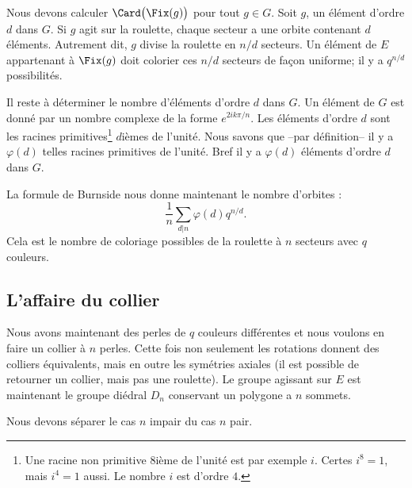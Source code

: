 Nous devons calculer \( \Card\big( \Fix(g) \big)\) pour tout \( g\in G\). Soit \( g\), un élément d'ordre \( d\) dans \( G\). Si \( g\) agit sur la roulette, chaque secteur a une orbite contenant \( d\) éléments. Autrement dit, \( g\) divise la roulette en \( n/d\) secteurs. Un élément de \( E\) appartenant à \( \Fix(g)\) doit colorier ces \( n/d\) secteurs de façon uniforme; il y a \( q^{n/d}\) possibilités.

Il reste à déterminer le nombre d'éléments d'ordre \( d\) dans \( G\). Un élément de \( G\) est donné par un nombre complexe de la forme \(  e^{2ik\pi/n}\). Les éléments d'ordre \( d\) sont les racines primitives\footnote{Une racine non primitive \( 8\)ième de l'unité est par exemple \( i\). Certes \( i^8=1\), mais \( i^4=1\) aussi. Le nombre \( i\) est d'ordre \( 4\).} \( d\)ièmes de l'unité. Nous savons que --par définition-- il y a \( \varphi(d)\) telles racines primitives de l'unité. Bref il y a \( \varphi(d)\) éléments d'ordre \( d\) dans \( G\). 

La formule de Burnside nous donne maintenant le nombre d'orbites :
\begin{equation}
    \frac{1}{ n }\sum_{d|n}\varphi(d)q^{n/d}.
\end{equation}
Cela est le nombre de coloriage possibles de la roulette à \( n\) secteurs avec \( q\) couleurs.

\subsection{L'affaire du collier}
\label{siOQlG}

Nous avons maintenant des perles de \( q\) couleurs différentes et nous voulons en faire un collier à \( n\) perles. Cette fois non seulement les rotations donnent des colliers équivalents, mais en outre les symétries axiales (il est possible de retourner un collier, mais pas une roulette). Le groupe agissant sur \( E\) est maintenant le groupe diédral \( D_n\) conservant un polygone a \( n\) sommets.

Nous devons séparer le cas \( n\) impair du cas \( n\) pair.

